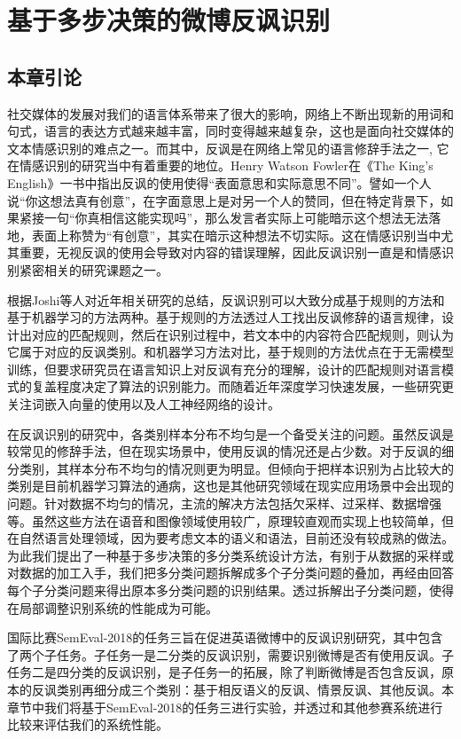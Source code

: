 \chapter{基于多步决策的微博反讽识别}
\label{cha:exp_irony_det}

\section{本章引论}

社交媒体的发展对我们的语言体系带来了很大的影响，网络上不断出现新的用词和句式，语言的表达方式越来越丰富，同时变得越来越复杂，这也是面向社交媒体的文本情感识别的难点之一。而其中，反讽是在网络上常见的语言修辞手法之一, 它在情感识别的研究当中有着重要的地位。Henry Watson Fowler在《The King's English》一书中指出反讽的使用使得“表面意思和实际意思不同”。譬如一个人说“你这想法真有创意”，在字面意思上是对另一个人的赞同，但在特定背景下，如果紧接一句“你真相信这能实现吗”，那么发言者实际上可能暗示这个想法无法落地，表面上称赞为“有创意”，其实在暗示这种想法不切实际。这在情感识别当中尤其重要，无视反讽的使用会导致对内容的错误理解，因此反讽识别一直是和情感识别紧密相关的研究课题之一。

根据Joshi等人\cite{joshi2017automatic}对近年相关研究的总结，反讽识别可以大致分成基于规则的方法和基于机器学习的方法两种。基于规则的方法透过人工找出反讽修辞的语言规律，设计出对应的匹配规则，然后在识别过程中，若文本中的内容符合匹配规则，则认为它属于对应的反讽类别。和机器学习方法对比，基于规则的方法优点在于无需模型训练，但要求研究员在语言知识上对反讽有充分的理解，设计的匹配规则对语言模式的复盖程度决定了算法的识别能力。而随着近年深度学习快速发展，一些研究更关注词嵌入向量的使用以及人工神经网络的设计。

在反讽识别的研究中，各类别样本分布不均匀是一个备受关注的问题。虽然反讽是较常见的修辞手法，但在现实场景中，使用反讽的情况还是占少数。对于反讽的细分类别，其样本分布不均匀的情况则更为明显。但倾向于把样本识别为占比较大的类别是目前机器学习算法的通病，这也是其他研究领域在现实应用场景中会出现的问题。针对数据不均匀的情况，主流的解决方法包括欠采样、过采样、数据增强等。虽然这些方法在语音和图像领域使用较广，原理较直观而实现上也较简单，但在自然语言处理领域，因为要考虑文本的语义和语法，目前还没有较成熟的做法。为此我们提出了一种基于多步决策的多分类系统设计方法，有别于从数据的采样或对数据的加工入手，我们把多分类问题拆解成多个子分类问题的叠加，再经由回答每个子分类问题来得出原本多分类问题的识别结果。透过拆解出子分类问题，使得在局部调整识别系统的性能成为可能。

国际比赛SemEval-2018的任务三\cite{van2018semeval}旨在促进英语微博中的反讽识别研究，其中包含了两个子任务。子任务一是二分类的反讽识别，需要识别微博是否有使用反讽。子任务二是四分类的反讽识别，是子任务一的拓展，除了判断微博是否包含反讽，原本的反讽类别再细分成三个类别：基于相反语义的反讽、情景反讽、其他反讽。本章节中我们将基于SemEval-2018的任务三进行实验，并透过和其他参赛系统进行比较来评估我们的系统性能。

